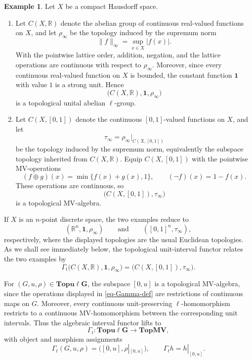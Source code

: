\documentclass[preprint,3p]{elsarticle}
\theoremstyle{plain}
\theoremstyle{definition}
\newtheorem{exmp}[thm]{Example}
\newcommand{\TopMV}{\mathbf{TopMV}}
\newcommand{\Topulg}{\mathbf{Topu\ell G}}
\numberwithin{equation}{section}
\begin{document}
\begin{exmp}
\label{exmp-function-algebras}
Let $X$ be a compact Hausdorff space.
\begin{enumerate}[label=(\alph*),ref=(\alph*)]
\item Let $C(X,\mathbb R)$ denote the abelian group of continuous
real-valued functions on $X$, and let $\rho_\infty$ be the topology
induced by the supremum norm
\[
 \|f\|_\infty=\sup_{x\in X}|f(x)|.
\]
With the pointwise lattice order, addition, negation, and the lattice
operations are continuous with respect to $\rho_\infty$.  Moreover, since
every continuous real-valued function on $X$ is bounded, the constant
function $\mathbf 1$ with value $1$ is a strong unit.  Hence
\[
 \bigl(C(X,\mathbb R),\mathbf 1,\rho_\infty\bigr)
\]
is a topological unital abelian $\ell$-group.

\item Let $C(X,[0,1])$ denote the continuous $[0,1]$-valued functions on
$X$, and let
\[
 \tau_\infty=\rho_\infty|_{C(X,[0,1])}
\]
be the topology induced by the supremum norm, equivalently the subspace
topology inherited from $C(X,\mathbb R)$.  Equip $C(X,[0,1])$ with the
pointwise MV-operations
\[
  (f\oplus g)(x)=\min\{f(x)+g(x),1\},\qquad
  (\neg f)(x)=1-f(x).
\]
These operations are continuous, so
\[
 \bigl(C(X,[0,1]),\tau_\infty\bigr)
\]
is a topological MV-algebra.
\end{enumerate}

If $X$ is an $n$-point discrete space, the two examples reduce to
\[
 (\mathbb R^n,\mathbf 1,\rho_\infty)
 \qquad\text{and}\qquad
 ([0,1]^n,\tau_\infty),
\]
respectively, where the displayed topologies are the usual Euclidean
topologies.  As we shall see immediately below, the topological
unit-interval functor relates the two examples by
\[
 \Gamma_t\bigl(C(X,\mathbb R),\mathbf 1,\rho_\infty\bigr)
 =
 \bigl(C(X,[0,1]),\tau_\infty\bigr).
\]
\end{exmp}

For $(G,u,\rho)\in\Topulg$, the subspace $[0,u]$ is a topological
MV-algebra, since the operations displayed in \eqref{eq-Gamma-def} are
restrictions of continuous maps on $G$.  Moreover, every continuous
unit-preserving $\ell$-homomorphism restricts to a continuous
MV-homomorphism between the corresponding unit intervals.  Thus the
algebraic interval functor lifts to
\begin{equation}
\label{eq-Gammat-functor}
 \Gamma_t\colon\Topulg\longrightarrow\TopMV,
\end{equation}
with object and morphism assignments
\begin{equation}
\label{eq-Gammat-definition}
 \Gamma_t(G,u,\rho)=([0,u],\rho|_{[0,u]}),
 \qquad
 \Gamma_t h=h|_{[0,u]}.
\end{equation}
\end{document}

